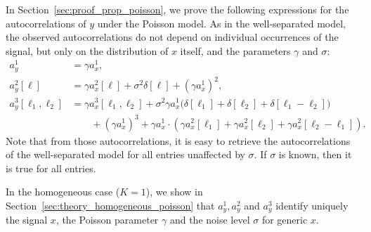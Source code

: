 \documentclass[12pt]{article}
\newcommand{\1}{\mathbf{1}}
\newcommand{\TODO}[1]{{\color{red}{[#1]}}}
\theoremstyle{plain}
\theoremstyle{definition}
\theoremstyle{remark}
\theoremstyle{plain}
\theoremstyle{remark}
\theoremstyle{plain}
\theoremstyle{plain}
\theoremstyle{plain}
\numberwithin{equation}{section}
\begin{document}
In Section~\ref{sec:proof_prop_poisson}, we prove the following expressions for the autocorrelations of $y$ under the Poisson model. As in the well-separated model, the observed autocorrelations do not depend on individual occurrences of the signal, but only on the distribution of $x$ itself, and the parameters $\gamma$ and $\sigma$: %
%
\begin{align}
	a_y^1  & =  \gamma a_{x}^1, \label{eq:mean_micrograph2} \\
	a_y^2[\ell] & = \gamma a_x^2[\ell] + \sigma^2 \delta[\ell] + (\gamma a_x^1)^2, \label{eq:ac2_micrograph2} \\
	a_y^3[\ell_1,\ell_2]  & =  \gamma a_x^3[\ell_1,\ell_2] + \sigma^2 \gamma a_x^1 \big(\delta[\ell_1]+\delta[\ell_2] +\delta[\ell_1-\ell_2] \big) \nonumber \\
						  & \qquad + (\gamma a_x^1)^3 + \gamma a_x^1 \cdot ( \gamma a_x^2[\ell_1] + \gamma a_x^2[\ell_2] + \gamma a_x^2[\ell_2-\ell_1]). \label{eq:ac3_micrograph2}
\end{align}
Note that from those autocorrelations, it is easy to retrieve the autocorrelations of the well-separated model for all entries unaffected by $\sigma$. If $\sigma$ is known, then it is true for all entries. 

In the homogeneous case ($K=1$), we show in Section~\ref{sec:theory_homogeneous_poisson} that $a_y^1,a_y^2$ and $a_y^3$ identify uniquely the signal $x$, the Poisson parameter $\gamma$ and the noise level $\sigma$ for generic $x$. 


%
\end{document}
